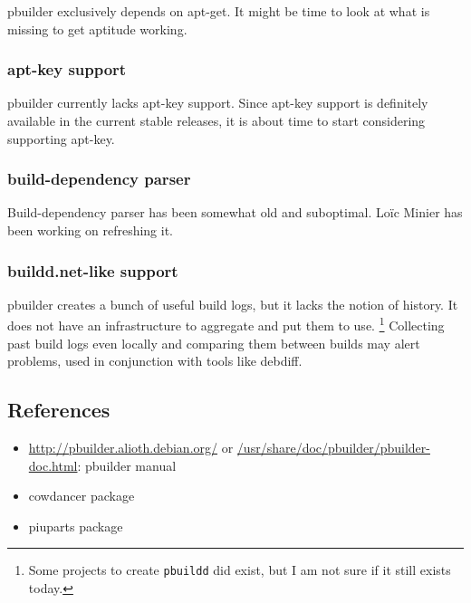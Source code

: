 \documentclass[a4paper]{article}
\begin{document}
pbuilder exclusively depends on apt-get.  It might be time to look at
what is missing to get aptitude working.

\subsubsection{apt-key support}

pbuilder currently lacks apt-key support.  Since apt-key support is
definitely available in the current stable releases, it is about time to
start considering supporting apt-key.

\subsubsection{build-dependency parser}

Build-dependency parser has been somewhat old and suboptimal.  Lo\"ic
Minier has been working on refreshing it.

\subsubsection{buildd.net-like support}

pbuilder creates a bunch of useful build logs, but it lacks the notion
of history. It does not have an infrastructure to aggregate and put them
to use.  \footnote{Some projects to create \texttt{pbuildd} did exist,
but I am not sure if it still exists today.  } Collecting past build
logs even locally and comparing them between builds may alert problems,
used in conjunction with tools like debdiff.

\subsection{References}

\begin{itemize}
 \item \url{http://pbuilder.alioth.debian.org/} or
 \url{/usr/share/doc/pbuilder/pbuilder-doc.html}: pbuilder manual
 \item cowdancer package
 \item piuparts package
\end{itemize}
\end{document}
